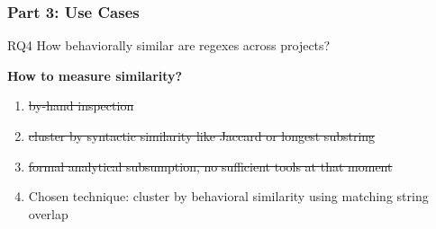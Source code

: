\begin{frame}
\frametitle{Part 3: Use Cases}

\begin{block}{RQ4}
How behaviorally similar are regexes across projects?
\end{block}
%
\textbf{How to measure similarity?}

\begin{enumerate}
\item<3-> \sout{by-hand inspection}
\item<4-> \sout{cluster by syntactic similarity like Jaccard or longest substring}
\item<5-> \sout{formal analytical subsumption, no sufficient tools at that moment}
\item<6-> \begin{Large}Chosen technique: cluster by behavioral similarity using matching string overlap \end{Large}
\end{enumerate}
\end{frame}



